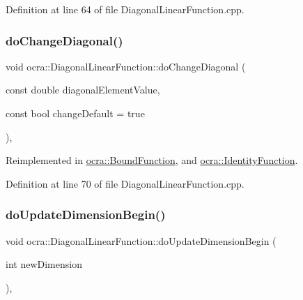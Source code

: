 Definition at line 64 of file Diagonal\+Linear\+Function.\+cpp.

\hypertarget{classocra_1_1DiagonalLinearFunction_a0673bfe405d5637182c4749dd2737e95}{}\label{classocra_1_1DiagonalLinearFunction_a0673bfe405d5637182c4749dd2737e95} 
\subsubsection{\texorpdfstring{do\+Change\+Diagonal()}{doChangeDiagonal()}\hspace{0.1cm}{\footnotesize\ttfamily [2/2]}}
{\footnotesize\ttfamily void ocra\+::\+Diagonal\+Linear\+Function\+::do\+Change\+Diagonal (\begin{DoxyParamCaption}\item[{const double}]{diagonal\+Element\+Value,  }\item[{const bool}]{change\+Default = {\ttfamily true} }\end{DoxyParamCaption})\hspace{0.3cm}{\ttfamily [protected]}, {\ttfamily [virtual]}}



Reimplemented in \hyperlink{classocra_1_1BoundFunction_ac1a1b78b8b1796543b4c83ae5d8de755}{ocra\+::\+Bound\+Function}, and \hyperlink{classocra_1_1IdentityFunction_ac6350bcc2107b56e96642cacbbee2404}{ocra\+::\+Identity\+Function}.



Definition at line 70 of file Diagonal\+Linear\+Function.\+cpp.

\hypertarget{classocra_1_1DiagonalLinearFunction_a86b326e3578c8405806eab4ec6522ab2}{}\label{classocra_1_1DiagonalLinearFunction_a86b326e3578c8405806eab4ec6522ab2} 
\subsubsection{\texorpdfstring{do\+Update\+Dimension\+Begin()}{doUpdateDimensionBegin()}}
{\footnotesize\ttfamily void ocra\+::\+Diagonal\+Linear\+Function\+::do\+Update\+Dimension\+Begin (\begin{DoxyParamCaption}\item[{int}]{new\+Dimension }\end{DoxyParamCaption})\hspace{0.3cm}{\ttfamily [protected]}, {\ttfamily [virtual]}}

